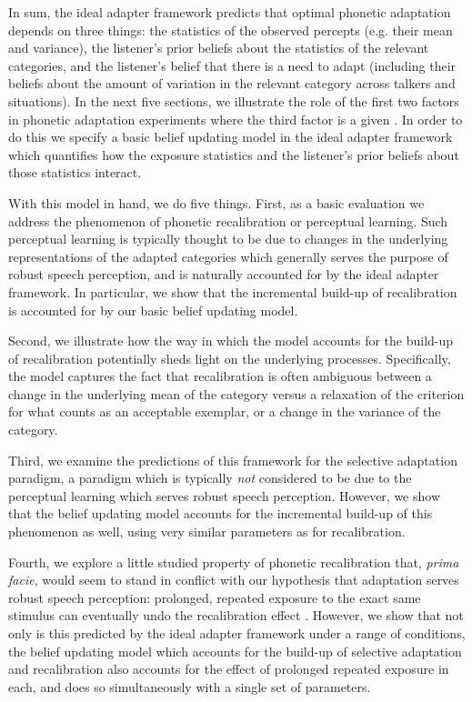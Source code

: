 In sum, the ideal adapter framework predicts that optimal phonetic adaptation depends on three things: the statistics of the observed percepts (e.g. their mean and variance), the listener's prior beliefs about the statistics of the relevant categories, and the listener's belief that there is a need to adapt (including their beliefs about the amount of variation in the relevant category across talkers and situations). In the next five sections, we illustrate the role of the first two factors in phonetic adaptation experiments where the third factor is a given \autocite[i.e., where there is a clear need to adapt and for which previous work has shown that listeners indeed adapt,][]{Bertelson2003,Kraljic2005,Norris2003}.  In order to do this we specify a basic belief updating model in the ideal adapter framework which quantifies how the exposure statistics and the listener's prior beliefs about those statistics interact.

With this model in hand, we do five things.  First, as a basic evaluation we address the phenomenon of phonetic recalibration or perceptual learning. %
Such perceptual learning is typically thought to be due to changes in the underlying representations of the adapted categories which generally serves the purpose of robust speech perception, and is naturally accounted for by the ideal adapter framework.  In particular, we show that the incremental build-up of recalibration is accounted for by our basic belief updating model.

Second, we illustrate how the way in which the model accounts for the build-up of recalibration potentially sheds light on the underlying processes. %
Specifically, the model captures the fact that recalibration is often ambiguous between a change in the underlying mean of the category versus a relaxation of the criterion for what counts as an acceptable exemplar, or a change in the variance of the category.

Third, we examine the predictions of this framework for the selective adaptation paradigm, a paradigm which is typically \emph{not} considered to be due to the perceptual learning which serves robust speech perception.  However, we show that the belief updating model accounts for the incremental build-up of this phenomenon as well, using very similar parameters as for recalibration.

Fourth, we explore a little studied property of phonetic recalibration that, {\em prima facie}, would seem to stand in conflict with our hypothesis that adaptation serves robust speech perception: prolonged, repeated exposure to the exact same stimulus can eventually undo the recalibration effect \cite{Vroomen2007}.  However, we show that not only is this predicted by the ideal adapter framework under a range of conditions, the belief updating model which accounts for the build-up of selective adaptation and recalibration also accounts for the effect of prolonged repeated exposure in each, and does so simultaneously with a single set of parameters.%

